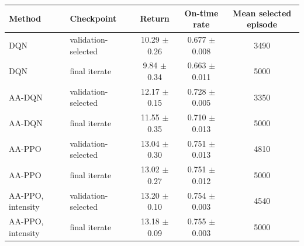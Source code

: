\begin{tabular}{llccc}
\toprule
Method & Checkpoint & Return & On-time rate & Mean selected episode \\
\midrule
DQN & validation-selected & 10.29 $\pm$ 0.26 & 0.677 $\pm$ 0.008 & 3490 \\
DQN & final iterate & 9.84 $\pm$ 0.34 & 0.663 $\pm$ 0.011 & 5000 \\
AA-DQN & validation-selected & 12.17 $\pm$ 0.15 & 0.728 $\pm$ 0.005 & 3350 \\
AA-DQN & final iterate & 11.55 $\pm$ 0.35 & 0.710 $\pm$ 0.013 & 5000 \\
AA-PPO & validation-selected & 13.04 $\pm$ 0.30 & 0.751 $\pm$ 0.013 & 4810 \\
AA-PPO & final iterate & 13.02 $\pm$ 0.27 & 0.751 $\pm$ 0.012 & 5000 \\
AA-PPO, intensity & validation-selected & 13.20 $\pm$ 0.10 & 0.754 $\pm$ 0.003 & 4540 \\
AA-PPO, intensity & final iterate & 13.18 $\pm$ 0.09 & 0.755 $\pm$ 0.003 & 5000 \\
\bottomrule
\end{tabular}